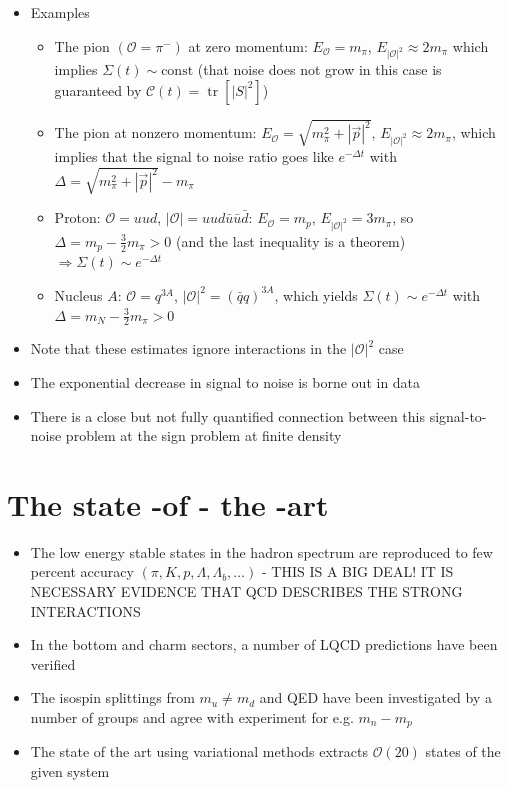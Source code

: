 \begin{itemize}
    \item Examples
    \begin{itemize}
        \item The pion $(\mathcal{O} = \pi^-)$ at zero momentum: $E_\mathcal{O} = m_\pi$, $E_{|\mathcal{O}|^2} \approx 2 m_\pi$ which implies $\Sigma(t)\sim\text{const}$ (that noise does not grow in this case is guaranteed by $\mathcal{C}(t) = \operatorname{tr}[|S|^2]$)
        \item The pion at nonzero momentum: $E_\mathcal{O} = \sqrt{m_\pi^2 + |\vec{p}|^2}$, $E_{|\mathcal{O}|^2} \approx 2 m_\pi$, which implies that the signal to noise ratio goes like $e^{-\Delta t}$ with $\Delta = \sqrt{m_\pi^2 + | \vec{p}|^2} - m_\pi$
        \item Proton: $\mathcal{O} = u u d$, $|\mathcal{O}| = u u d \bar{u} \bar{u} \bar{d}$: $E_\mathcal{O} = m_p$, $E_{|\mathcal{O}|^2} = 3 m_\pi$, so $\Delta = m_p - \frac{3}{2}m_\pi > 0$ (and the last inequality is a theorem) $\Longrightarrow \Sigma(t)\sim e^{-\Delta t}$
        \item Nucleus $A$: $\mathcal{O} = q^{3A}$, $|\mathcal{O}|^2 = (\bar{q} q)^{3 A}$, which yields $\Sigma(t)\sim e^{-\Delta t}$ with $\Delta = m_N - \frac{3}{2} m_\pi > 0$
    \end{itemize}
    \item Note that these estimates ignore interactions in the $| \mathcal{O}|^2$ case
    \item The exponential decrease in signal to noise is borne out in data
    \item There is a close but not fully quantified connection between this signal-to-noise problem at the sign problem at finite density
\end{itemize}


\section{The state -of - the -art}
\begin{itemize}
    \item The low energy stable states in the hadron spectrum are reproduced to few percent accuracy $(\pi, K, p, \Lambda, \Lambda_b, \ldots)$ - THIS IS A BIG DEAL! IT IS NECESSARY EVIDENCE THAT QCD DESCRIBES THE STRONG INTERACTIONS
    \item In the bottom and charm sectors, a number of LQCD predictions have been verified
    \item The isospin splittings from $m_u \neq m_d$ and QED have been investigated by a number of groups and agree with experiment for e.g. $m_n - m_p$
    \item The state of the art using variational methods extracts $\mathcal{O}(20)$ states of the given system 
\end{itemize}
